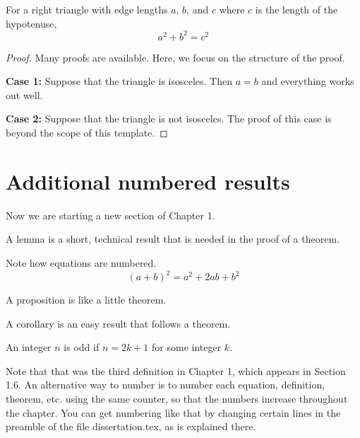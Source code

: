 \begin{theorem}
For a right triangle with edge lengths $a$, $b$, and $c$ where $c$ is the length of the hypotenuse, 
\begin{equation}
    a^2 + b^2 = c^2
\end{equation}
\end{theorem}
\begin{proof}
Many proofs are available.  Here, we focus on the structure of the proof.

\noindent
{\bf Case 1:} Suppose that the triangle is isosceles.
Then $a = b$ and everything works out well.

\noindent
{\bf Case 2:} Suppose that the triangle is not isosceles.
The proof of this case is beyond the scope of this template.
\end{proof}

\section{Additional numbered results}

Now we are starting a new section of Chapter 1.

\begin{lemma}
A lemma is a short, technical result that is needed in the proof of a theorem.
\end{lemma}

Note how equations are numbered.
\begin{equation}
    (a+b)^2 = a^2 + 2 ab + b^2
\end{equation}

\begin{proposition}
A proposition is like a little theorem.
\end{proposition}

\begin{corollary}
A corollary is an easy result that follows a theorem.
\end{corollary}

\begin{definition}
An integer $n$ is odd if $n=2k+1$ for some integer $k$.
\end{definition}

Note that that was the third definition in Chapter 1, which appears in Section 1.6.
An alternative way to number is to number each equation, definition, theorem, etc. using the same counter, so that the numbers increase throughout the chapter.
You can get numbering like that by changing certain lines in the preamble of the file dissertation.tex, as is explained there.